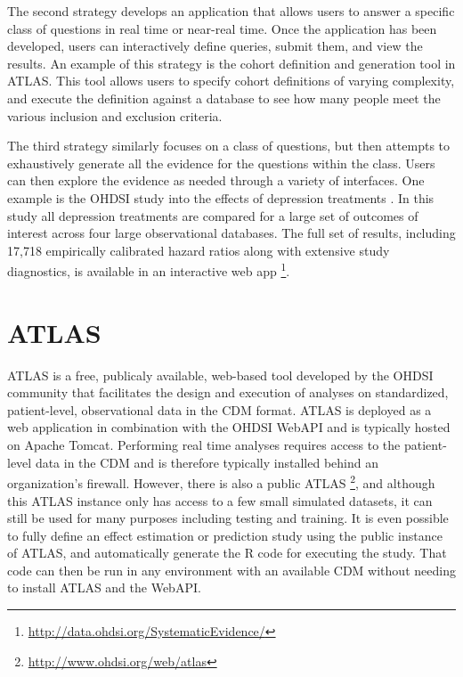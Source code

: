 \documentclass[11pt]{book}
\let\rmarkdownfootnote\footnote%
\def\footnote{\protect\rmarkdownfootnote}
\theoremstyle{definition}
\theoremstyle{definition}
\theoremstyle{definition}
\theoremstyle{remark}
\begin{document}
The second strategy develops an application that allows users to answer a specific class of questions in real time or near-real time. Once the application has been developed, users can interactively define queries, submit them, and view the results. An example of this strategy is the cohort definition and generation tool in ATLAS. This tool allows users to specify cohort definitions of varying complexity, and execute the definition against a database to see how many people meet the various inclusion and exclusion criteria.

The third strategy similarly focuses on a class of questions, but then attempts to exhaustively generate all the evidence for the questions within the class. Users can then explore the evidence as needed through a variety of interfaces. One example is the OHDSI study into the effects of depression treatments \citep{schuemie_2018b}. In this study all depression treatments are compared for a large set of outcomes of interest across four large observational databases. The full set of results, including 17,718 empirically calibrated hazard ratios along with extensive study diagnostics, is available in an interactive web app \footnote{\url{http://data.ohdsi.org/SystematicEvidence/}}.

\hypertarget{atlas}{%
\section{ATLAS}\label{atlas}}

ATLAS is a free, publicaly available, web-based tool developed by the OHDSI community that facilitates the design and execution of analyses on standardized, patient-level, observational data in the CDM format. ATLAS is deployed as a web application in combination with the OHDSI WebAPI and is typically hosted on Apache Tomcat. Performing real time analyses requires access to the patient-level data in the CDM and is therefore typically installed behind an organization's firewall. However, there is also a public ATLAS \footnote{\url{http://www.ohdsi.org/web/atlas}}, and although this ATLAS instance only has access to a few small simulated datasets, it can still be used for many purposes including testing and training. It is even possible to fully define an effect estimation or prediction study using the public instance of ATLAS, and automatically generate the R code for executing the study. That code can then be run in any environment with an available CDM without needing to install ATLAS and the WebAPI. 
\end{document}
